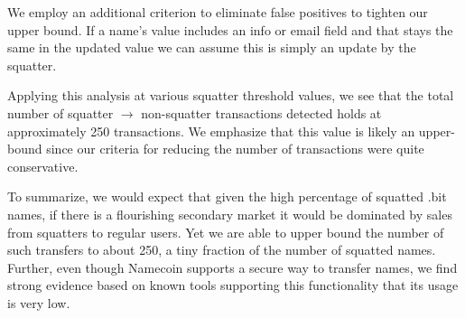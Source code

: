 We employ an additional criterion to eliminate false positives to tighten our upper bound. 
If a name's value includes an info or email field and that stays the same in the updated value we can assume this is simply an update by the squatter. 


Applying this analysis at various squatter threshold values, we see that the total number of squatter $\rightarrow$ non-squatter transactions detected holds at approximately 250 transactions. We emphasize that this value is likely an upper-bound since our criteria for reducing the number of transactions were quite conservative. 

To summarize, we would expect that given the high percentage of squatted .bit names, if there is a flourishing secondary market it would be dominated by sales from squatters to regular users. Yet we are able to upper bound the number of such transfers to about 250, a tiny fraction of the number of squatted names. Further, even though Namecoin supports a secure way to transfer names, we find strong evidence based on known tools supporting this functionality that its usage is very low.
